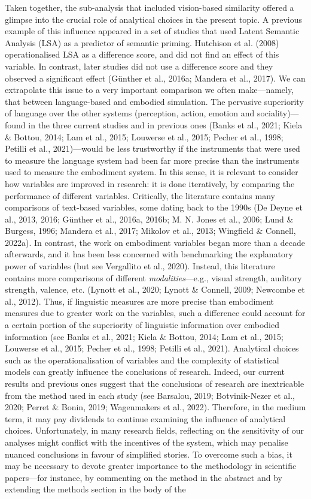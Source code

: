 \documentclass[
  12pt,
  man,floatsintext]{apa7}
\begin{document}
Taken together, the sub-analysis that included vision-based similarity offered a glimpse into the crucial role of analytical choices in the present topic. A previous example of this influence appeared in a set of studies that used Latent Semantic Analysis (LSA) as a predictor of semantic priming. Hutchison et al. (2008) operationalised LSA as a difference score, and did not find an effect of this variable. In contrast, later studies did not use a difference score and they observed a significant effect (Günther et al., 2016a; Mandera et al., 2017). We can extrapolate this issue to a very important comparison we often make---namely, that between language-based and embodied simulation. The pervasive superiority of language over the other systems (perception, action, emotion and sociality)---found in the three current studies and in previous ones (Banks et al., 2021; Kiela \& Bottou, 2014; Lam et al., 2015; Louwerse et al., 2015; Pecher et al., 1998; Petilli et al., 2021)---would be less trustworthy if the instruments that were used to measure the language system had been far more precise than the instruments used to measure the embodiment system. In this sense, it is relevant to consider how variables are improved in research: it is done iteratively, by comparing the performance of different variables. Critically, the literature contains many comparisons of text-based variables, some dating back to the 1990s (De Deyne et al., 2013, 2016; Günther et al., 2016a, 2016b; M. N. Jones et al., 2006; Lund \& Burgess, 1996; Mandera et al., 2017; Mikolov et al., 2013; Wingfield \& Connell, 2022a). In contrast, the work on embodiment variables began more than a decade afterwards, and it has been less concerned with benchmarking the explanatory power of variables (but see Vergallito et al., 2020). Instead, this literature contains more comparisons of different \emph{modalities}---e.g., visual strength, auditory strength, valence, etc. (Lynott et al., 2020; Lynott \& Connell, 2009; Newcombe et al., 2012). Thus, if linguistic measures are more precise than embodiment measures due to greater work on the variables, such a difference could account for a certain portion of the superiority of linguistic information over embodied information (see Banks et al., 2021; Kiela \& Bottou, 2014; Lam et al., 2015; Louwerse et al., 2015; Pecher et al., 1998; Petilli et al., 2021). Analytical choices such as the operationalisation of variables and the complexity of statistical models can greatly influence the conclusions of research. Indeed, our current results and previous ones suggest that the conclusions of research are inextricable from the method used in each study (see Barsalou, 2019; Botvinik-Nezer et al., 2020; Perret \& Bonin, 2019; Wagenmakers et al., 2022). Therefore, in the medium term, it may pay dividends to continue examining the influence of analytical choices. Unfortunately, in many research fields, reflecting on the sensitivity of our analyses might conflict with the incentives of the system, which may penalise nuanced conclusions in favour of simplified stories. To overcome such a bias, it may be necessary to devote greater importance to the methodology in scientific papers---for instance, by commenting on the method in the abstract and by extending the methods section in the body of the 
\end{document}
